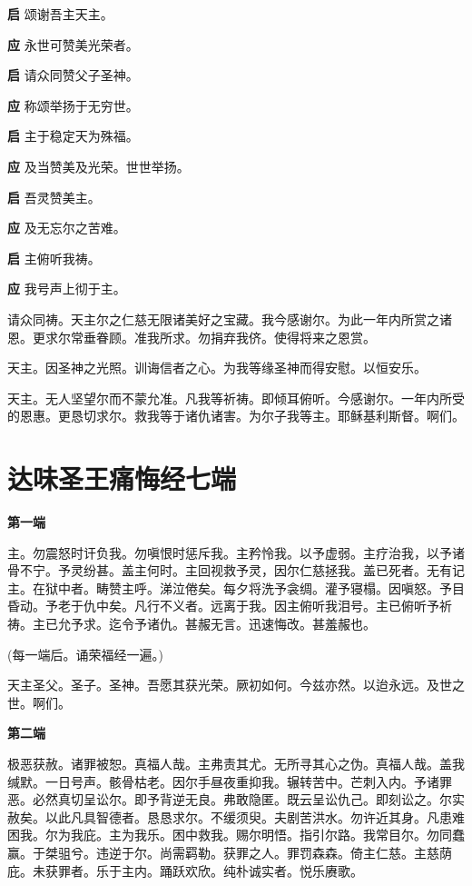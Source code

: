 \documentclass[UTF8,17pt]{ctexart}
\begin{document}
\textbf{启} \quad 颂谢吾主天主。

\textbf{应} \quad 永世可赞美光荣者。

\textbf{启} \quad 请众同赞⽗⼦圣神。

\textbf{应} \quad 称颂举扬于⽆穷世。

\textbf{启} \quad 主于稳定天为殊福。

\textbf{应} \quad 及当赞美及光荣。世世举扬。

\textbf{启} \quad 吾灵赞美主。

\textbf{应} \quad 及⽆忘尔之苦难。

\textbf{启} \quad 主俯听我祷。

\textbf{应} \quad 我号声上彻于主。

请众同祷。天主尔之仁慈⽆限诸美好之宝藏。我今感谢尔。为此⼀年内所赏之诸恩。更求尔常垂眷顾。准我所求。勿捐弃我侪。使得将来之恩赏。

天主。因圣神之光照。训诲信者之⼼。为我等缘圣神⽽得安慰。以恒安乐。

天主。⽆⼈坚望尔⽽不蒙允准。凡我等祈祷。即倾⽿俯听。今感谢尔。⼀年内所受的恩惠。更恳切求尔。救我等于诸仇诸害。为尔⼦我等主。耶稣基利斯督。啊们。

\section{达味圣王痛悔经七端}

\textbf{第一端}

主。勿震怒时讦负我。勿嗔恨时惩斥我。主矜怜我。以予虚弱。主疗治我，以予诸⾻不宁。予灵纷甚。盖主何时。主回视救予灵，因尔仁慈拯我。盖已死者。⽆有记主。在狱中者。畴赞主呼。涕泣倦矣。每夕将洗予衾绸。灌予寝榻。因嗔怒。予⽬昏动。予⽼于仇中矣。凡⾏不义者。远离于我。因主俯听我泪号。主已俯听予祈祷。主已允予求。迄令予诸仇。甚赧⽆⾔。迅速悔改。甚羞赧也。

(每⼀端后。诵荣福经⼀遍。)

天主圣⽗。圣⼦。圣神。吾愿其获光荣。厥初如何。今兹亦然。以迨永远。及世之世。啊们。

\textbf{第⼆端}

极恶获赦。诸罪被恕。真福⼈哉。主弗责其尤。⽆所寻其⼼之伪。真福⼈哉。盖我缄默。⼀⽇号声。骸⾻枯⽼。因尔⼿昼夜重抑我。辗转苦中。芒刺⼊内。予诸罪恶。必然真切呈讼尔。即予背逆⽆良。弗敢隐匿。既云呈讼仇己。即刻讼之。尔实赦矣。以此凡具智德者。恳恳求尔。不缓须臾。夫剧苦洪⽔。勿许近其⾝。凡患难困我。尔为我庇。主为我乐。困中救我。赐尔明悟。指引尔路。我常目尔。勿同蠢赢。于桀驵兮。违逆于尔。尚需羁勒。获罪之⼈。罪罚森森。倚主仁慈。主慈荫庇。未获罪者。乐于主内。踊跃欢欣。纯朴诚实者。悦乐赓歌。
\end{document}
